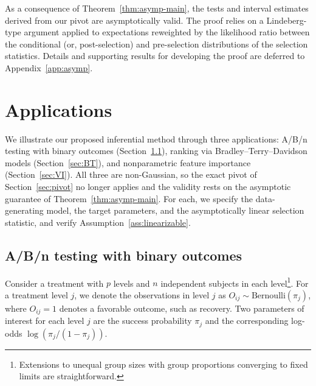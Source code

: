 \documentclass[12pt]{article}
\begin{document}
As a consequence of Theorem~\ref{thm:asymp-main}, the tests and interval estimates derived from our pivot are asymptotically valid.
The proof relies on a Lindeberg-type argument applied to expectations reweighted by the likelihood ratio between the conditional (or, post-selection) and pre-selection distributions of the selection statistics. 
Details and supporting results for developing the proof are deferred to Appendix~\ref{app:asymp}.




\section{Applications}
\label{sec:examples}

We illustrate our proposed inferential method through three applications: A/B/n testing with binary outcomes (Section~\ref{sec:dosage}), ranking via Bradley--Terry--Davidson models (Section~\ref{sec:BT}), and nonparametric feature importance (Section~\ref{sec:VI}). All three are non-Gaussian, so the exact pivot of Section~\ref{sec:pivot} no longer applies and the validity rests on the asymptotic guarantee of Theorem~\ref{thm:asymp-main}. For each, we specify the data-generating model, the target parameters, and the asymptotically linear selection statistic, and verify Assumption~\ref{ass:linearizable}.


\subsection{A/B/n testing with binary outcomes}
\label{sec:dosage}

Consider a treatment with $p$ levels and $n$ independent subjects in each level\footnote{Extensions to unequal group sizes with group proportions converging to fixed limits are straightforward.}. 
For a treatment level $j$, we denote the observations in level $j$ as $O_{ij}\sim \mathrm{Bernoulli}(\pi_j)$, where $O_{ij}=1$ denotes a favorable outcome, such as recovery.
Two parameters of interest for each level $j$ are the success probability $\pi_j$ and the corresponding log-odds $\log(\pi_j/(1-\pi_j))$.
\end{document}
